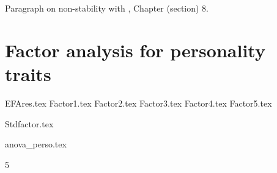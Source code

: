 \documentclass[a4paper, 11pt, onecolumn]{article}
\begin{document}
Paragraph on non-stability with \cite{Almlund2011}, Chapter (section) 8.


\clearpage
\newpage
\section{Factor analysis for personality traits}
\label{section:efa_big5}

{EFAres.tex}
{Factor1.tex}
{Factor2.tex}
{Factor3.tex}
{Factor4.tex}
{Factor5.tex}

{Stdfactor.tex}

{anova_perso.tex}






\clearpage
\newpage
\setcounter{tocdepth}5
\tableofcontents

\end{document}

